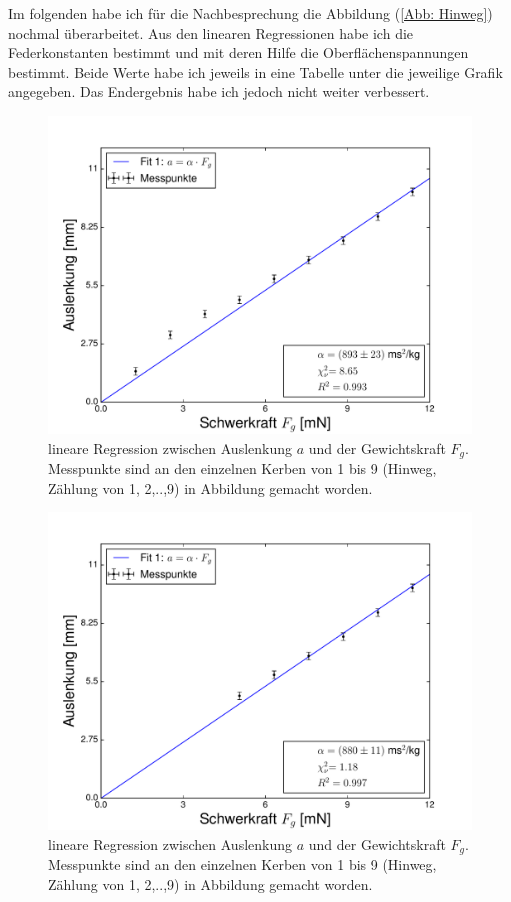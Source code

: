 Im folgenden habe ich für die Nachbesprechung die Abbildung (\ref{Abb: Hinweg}) nochmal überarbeitet. Aus den linearen Regressionen habe ich die Federkonstanten bestimmt und mit deren Hilfe die Oberflächenspannungen bestimmt. Beide Werte habe ich jeweils in eine Tabelle unter die jeweilige Grafik angegeben. Das Endergebnis habe ich jedoch nicht weiter verbessert.

\newpage

\begin{figure}[ht!]
	\centering
	\includegraphics[width=400pt]{fotos/gpr1/M5_Hinweg_1.pdf}
	\caption[Regression 1 Korrektur 1]{lineare Regression zwischen Auslenkung $ a $ und der Gewichtskraft $ F_{g} $. Messpunkte sind an den einzelnen Kerben von 1 bis 9 (Hinweg, Zählung von 1, 2,..,9) in Abbildung gemacht worden. }
	\label{Abb: Hinweg1}
\end{figure}



\newpage
\begin{figure}[ht!]
	\centering
	\includegraphics[width=400pt]{fotos/gpr1/M5_Hinweg_2.pdf}
	\caption[Regression 1 Korrektur 2]{lineare Regression zwischen Auslenkung $ a $ und der Gewichtskraft $ F_{g} $. Messpunkte sind an den einzelnen Kerben von 1 bis 9 (Hinweg, Zählung von 1, 2,..,9) in Abbildung gemacht worden. }
	\label{Abb: Hinweg2}
\end{figure}

